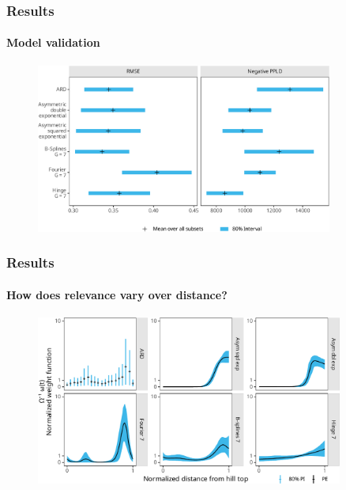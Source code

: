 \documentclass{snedecorbeamer}
\begin{document}
\begin{frame}
  \frametitle{Results}
  \framesubtitle{Model validation}

  \begin{figure}
    \centering
    \includegraphics[height=15em]{inc/wepp_validation_summary_tiny_fsc140.pdf}
  \end{figure}

\end{frame}

\begin{frame}
  \frametitle{Results}
  \framesubtitle{How does relevance vary over distance?}

  \begin{figure}
    \centering
    \includegraphics[height=15em]{inc/wepp_weight_posterior_tiny_fsc140.pdf}
  \end{figure}

\end{frame}
\end{document}
